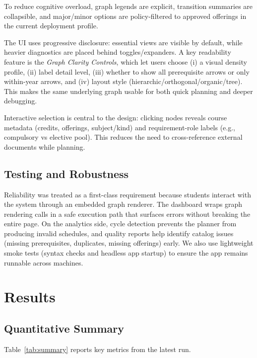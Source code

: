 To reduce cognitive overload, graph legends are explicit, transition summaries
are collapsible, and major/minor options are policy-filtered to approved
offerings in the current deployment profile.

The UI uses progressive disclosure: essential views are visible by default,
while heavier diagnostics are placed behind toggles/expanders. A key
readability feature is the \textit{Graph Clarity Controls}, which let users
choose (i) a visual density profile, (ii) label detail level, (iii) whether to
show all prerequisite arrows or only within-year arrows, and (iv) layout style
(hierarchic/orthogonal/organic/tree). This makes the same underlying graph
usable for both quick planning and deeper debugging.

Interactive selection is central to the design: clicking nodes reveals course
metadata (credits, offerings, subject/kind) and requirement-role labels (e.g.,
compulsory vs elective pool). This reduces the need to cross-reference external
documents while planning.

\subsection{Testing and Robustness}
Reliability was treated as a first-class requirement because students interact
with the system through an embedded graph renderer. The dashboard wraps graph
rendering calls in a safe execution path that surfaces errors without breaking
the entire page. On the analytics side, cycle detection prevents the planner
from producing invalid schedules, and quality reports help identify catalog
issues (missing prerequisites, duplicates, missing offerings) early. We also
use lightweight smoke tests (syntax checks and headless app startup) to ensure
the app remains runnable across machines.

\section{Results}
\subsection{Quantitative Summary}
Table~\ref{tab:summary} reports key metrics from the latest run.

